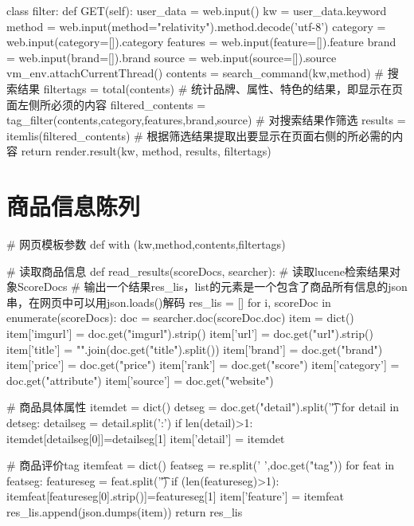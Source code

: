 \begin{python}
class filter:
    def GET(self):
        user_data = web.input()
        kw = user_data.keyword
        method = web.input(method="relativity").method.decode('utf-8')
        category = web.input(category=[]).category
        features = web.input(feature=[]).feature
        brand = web.input(brand=[]).brand
        source = web.input(source=[]).source
        vm_env.attachCurrentThread()
        contents = search_command(kw,method) # 搜索结果
        filtertags = total(contents) # 统计品牌、属性、特色的结果，即显示在页面左侧所必须的内容
        filtered_contents = tag_filter(contents,category,features,brand,source)
                                     # 对搜索结果作筛选
        results = itemlis(filtered_contents) # 根据筛选结果提取出要显示在页面右侧的所必需的内容
        return render.result(kw, method, results, filtertags)
\end{python}


\section{商品信息陈列}

\begin{python}
# 网页模板参数
def with (kw,method,contents,filtertags)
\end{python}

\begin{python}
# 读取商品信息
def read_results(scoreDocs, searcher):
    # 读取lucene检索结果对象ScoreDocs
    # 输出一个结果res_lis，list的元素是一个包含了商品所有信息的json串，在网页中可以用json.loads()解码
    res_lis = []
    for i, scoreDoc in enumerate(scoreDocs):
        doc = searcher.doc(scoreDoc.doc)
        item = dict()
        item['imgurl'] = doc.get("imgurl").strip()
        item['url'] = doc.get("url").strip()
        item['title'] = "".join(doc.get("title").split())
        item['brand'] = doc.get("brand")
        item['price'] = doc.get("price")
        item['rank'] = doc.get("score")
        item['category'] = doc.get("attribute")
        item['source'] = doc.get("website")

        # 商品具体属性
        itemdet = dict()
        detseg = doc.get("detail").split('\t')
        for detail in detseg:
            detailseg = detail.split(':')
            if len(detail)>1:
                itemdet[detailseg[0]]=detailseg[1]
        item['detail'] = itemdet

        # 商品评价tag
        itemfeat = dict()
        featseg = re.split(' ',doc.get("tag"))
        for feat in featseg:
            featureseg = feat.split('\t')
            if (len(featureseg)>1):
                itemfeat[featureseg[0].strip()]=featureseg[1]
        item['feature'] = itemfeat
        res_lis.append(json.dumps(item))
    return res_lis
\end{python}



